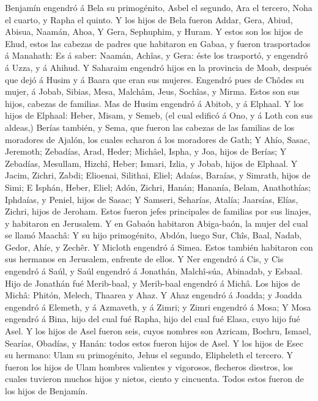  Benjamín engendró á Bela su primogénito, Asbel el segundo,
Ara el tercero,  Noha el cuarto, y Rapha el quinto.
 Y los hijos de Bela fueron Addar, Gera, Abiud, 
Abisua, Naamán, Ahoa,  Y Gera, Sephuphim, y Huram.
 Y estos son los hijos de Ehud, estos las cabezas de padres
que habitaron en Gabaa, y fueron trasportados á Manahath: 
Es á saber: Naamán, Achîas, y Gera: éste los trasportó, y engendró á
Uzza, y á Ahihud.  Y Saharaim engendró hijos en la provincia
de Moab, después que dejó á Husim y á Baara que eran sus mujeres.
 Engendró pues de Chôdes su mujer, á Jobab, Sibias, Mesa,
Malchâm,  Jeus, Sochîas, y Mirma. Estos son sus hijos,
cabezas de familias.  Mas de Husim engendró á Abitob, y á
Elphaal.  Y los hijos de Elphaal: Heber, Misam, y Semeb,
(el cual edificó á Ono, y á Loth con sus aldeas,)  Berías
también, y Sema, que fueron las cabezas de las familias de los moradores
de Ajalón, los cuales echaron á los moradores de Gath;  Y
Ahío, Sasac, Jeremoth;  Zebadías, Arad, Heder;
 Michâel, Ispha, y Joa, hijos de Berías;  Y
Zebadías, Mesullam, Hizchî, Heber;  Ismari, Izlia, y Jobab,
hijos de Elphaal.  Y Jacim, Zichri, Zabdi; 
Elioenai, Silithai, Eliel;  Adaías, Baraías, y Simrath,
hijos de Simi;  E Isphán, Heber, Eliel;  Adón,
Zichri, Hanán;  Hananía, Belam, Anathothías; 
Iphdaías, y Peniel, hijos de Sasac;  Y Samseri, Seharías,
Atalía;  Jaarsías, Elías, Zichri, hijos de Jeroham.
 Estos fueron jefes principales de familias por sus
linajes, y habitaron en Jerusalem.  Y en Gabaón habitaron
Abiga-baón, la mujer del cual se llamó Maachâ:  Y su hijo
primogénito, Abdón, luego Sur, Chîs, Baal, Nadab,  Gedor,
Ahíe, y Zechêr.  Y Micloth engendró á Simea. Estos también
habitaron con sus hermanos en Jerusalem, enfrente de ellos.
 Y Ner engendró á Cis, y Cis engendró á Saúl, y Saúl
engendró á Jonathán, Malchî-súa, Abinadab, y Esbaal.  Hijo
de Jonathán fué Merib-baal, y Merib-baal engendró á Michâ. 
Los hijos de Michâ: Phitón, Melech, Thaarea y Ahaz.  Y Ahaz
engendró á Joadda; y Joadda engendró á Elemeth, y á Azmaveth, y á Zimri;
y Zimri engendró á Mosa;  Y Mosa engendró á Bina, hijo del
cual fué Rapha, hijo del cual fué Elasa, cuyo hijo fué Asel.
 Y los hijos de Asel fueron seis, cuyos nombres son
Azricam, Bochru, Ismael, Searías, Obadías, y Hanán: todos estos fueron
hijos de Asel.  Y los hijos de Esec su hermano: Ulam su
primogénito, Jehus el segundo, Elipheleth el tercero.  Y
fueron los hijos de Ulam hombres valientes y vigorosos, flecheros
diestros, los cuales tuvieron muchos hijos y nietos, ciento y cincuenta.
Todos estos fueron de los hijos de Benjamín.

